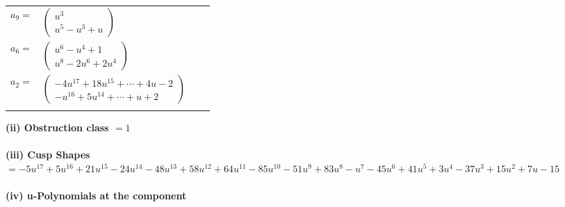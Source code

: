 \documentclass[1p]{elsarticle_modified}
\theoremstyle{definition}
\begin{document}
\begin{tabular}{m{7pt} m{180pt} m{7pt} m{180pt} }
\flushright $a_{9}=$&$\begin{pmatrix}u^3\\u^5- u^3+u\end{pmatrix}$ \\
\flushright $a_{6}=$&$\begin{pmatrix}u^6- u^4+1\\u^8-2 u^6+2 u^4\end{pmatrix}$ \\
\flushright $a_{2}=$&$\begin{pmatrix}-4 u^{17}+18 u^{15}+\cdots+4 u-2\\- u^{16}+5 u^{14}+\cdots+u+2\end{pmatrix}$\\&\end{tabular}
\flushleft \textbf{(ii) Obstruction class $= 1$}\\~\\
\flushleft \textbf{(iii) Cusp Shapes $= -5 u^{17}+5 u^{16}+21 u^{15}-24 u^{14}-48 u^{13}+58 u^{12}+64 u^{11}-85 u^{10}-51 u^9+83 u^8- u^7-45 u^6+41 u^5+3 u^4-37 u^3+15 u^2+7 u-15$}\\~\\
\newpage\renewcommand{\arraystretch}{1}
\flushleft \textbf{(iv) u-Polynomials at the component}\newline \\
\end{document}
